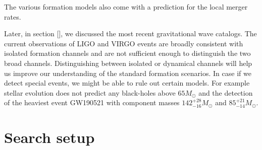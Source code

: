 The various formation models also come with a prediction for the local merger rates.      


Later, in section [], we discussed the most recent gravitational wave catalogs. The current observations of LIGO and VIRGO events are broadly consistent with isolated formation channels and are not sufficient enough to distinguish the two broad channels.  Distinguishing between isolated or dynamical channels will help us improve our understanding of the standard formation scenarios. In case if we detect special events, we might be able to rule out certain models. For example stellar evolution does not predict any black-holes above $65 M_{\odot}$ and the detection of the heaviest event GW190521 with component masses $142^{+28}_{-16} M_{\odot}$ and $85^{+21}_{-14} M_{\odot}$. 

\section{Search setup}